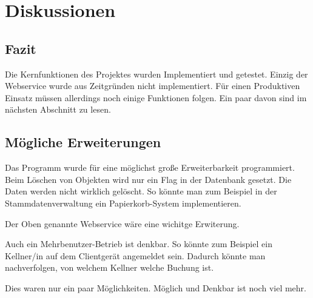 \section{Diskussionen}

\subsection{Fazit}

Die Kernfunktionen des Projektes wurden Implementiert und getestet. Einzig der Webservice wurde aus Zeitgründen nicht implementiert. Für einen Produktiven Einsatz müssen allerdings noch einige Funktionen folgen.
Ein paar davon sind im nächsten Abschnitt zu lesen.

\subsection{Mögliche Erweiterungen}

Das Programm wurde für eine möglichst große Erweiterbarkeit programmiert. Beim Löschen von Objekten wird nur ein Flag in der Datenbank gesetzt. 
Die Daten werden nicht wirklich gelöscht. So könnte man zum Beispiel in der Stammdatenverwaltung ein Papierkorb-System implementieren.

Der Oben genannte Webservice wäre eine wichitge Erwiterung.

Auch ein Mehrbenutzer-Betrieb ist denkbar. So könnte zum Beispiel ein Kellner/in auf dem Clientgerät angemeldet sein. 
Dadurch könnte man nachverfolgen, von welchem Kellner welche Buchung ist.

Dies waren nur ein paar Möglichkeiten. Möglich und Denkbar ist noch viel mehr.